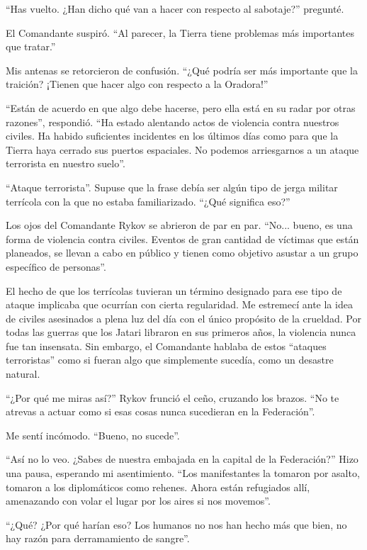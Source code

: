 \documentclass[spanish,12pt,a4paper,oneside,titlepage]{book}
\begin{document}
    ``Has vuelto. ¿Han dicho qué van a hacer con respecto al sabotaje?'' pregunté.

    El Comandante suspiró. ``Al parecer, la Tierra tiene problemas más importantes que tratar.''

    Mis antenas se retorcieron de confusión. ``¿Qué podría ser más importante que la traición? ¡Tienen que hacer algo con respecto a la Oradora!''

    ``Están de acuerdo en que algo debe hacerse, pero ella está en su radar por otras razones'', respondió. ``Ha estado alentando actos de violencia contra nuestros civiles. Ha habido suficientes incidentes en los últimos días como para que la Tierra haya cerrado sus puertos espaciales. No podemos arriesgarnos a un ataque terrorista en nuestro suelo''.

    ``Ataque terrorista''. Supuse que la frase debía ser algún tipo de jerga militar terrícola con la que no estaba familiarizado. ``¿Qué significa eso?''

    Los ojos del Comandante Rykov se abrieron de par en par. ``No... bueno, es una forma de violencia contra civiles. Eventos de gran cantidad de víctimas que están planeados, se llevan a cabo en público y tienen como objetivo asustar a un grupo específico de personas''.

    El hecho de que los terrícolas tuvieran un término designado para ese tipo de ataque implicaba que ocurrían con cierta regularidad. Me estremecí ante la idea de civiles asesinados a plena luz del día con el único propósito de la crueldad. Por todas las guerras que los Jatari libraron en sus primeros años, la violencia nunca fue tan insensata. Sin embargo, el Comandante hablaba de estos ``ataques terroristas'' como si fueran algo que simplemente sucedía, como un desastre natural.

    ``¿Por qué me miras así?'' Rykov frunció el ceño, cruzando los brazos. ``No te atrevas a actuar como si esas cosas nunca sucedieran en la Federación''.

    Me sentí incómodo. ``Bueno, no sucede''.

    ``Así no lo veo. ¿Sabes de nuestra embajada en la capital de la Federación?'' Hizo una pausa, esperando mi asentimiento. ``Los manifestantes la tomaron por asalto, tomaron a los diplomáticos como rehenes. Ahora están refugiados allí, amenazando con volar el lugar por los aires si nos movemos''.

    ``¿Qué? ¿Por qué harían eso? Los humanos no nos han hecho más que bien, no hay razón para derramamiento de sangre''.
\end{document}
